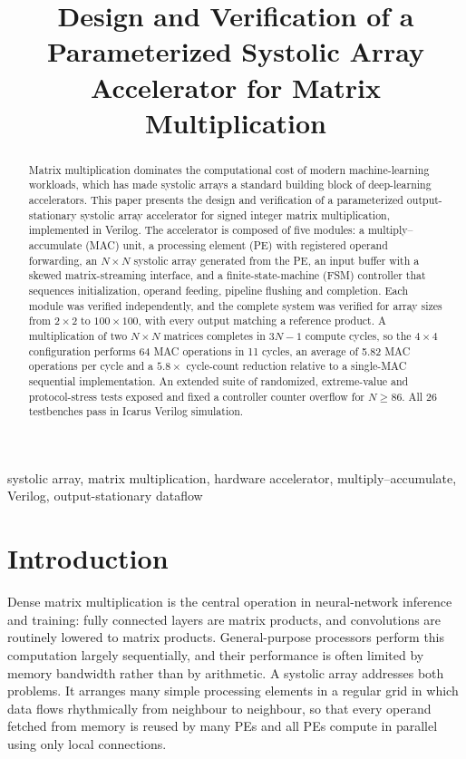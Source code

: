 \documentclass[conference]{IEEEtran}
\begin{document}
\title{Design and Verification of a Parameterized Systolic Array Accelerator for Matrix Multiplication}

\author{
}

\maketitle

\begin{abstract}
Matrix multiplication dominates the computational cost of modern machine-learning
workloads, which has made systolic arrays a standard building block of deep-learning
accelerators. This paper presents the design and verification of a parameterized
output-stationary systolic array accelerator for signed integer matrix multiplication,
implemented in Verilog. The accelerator is composed of five modules: a multiply--accumulate
(MAC) unit, a processing element (PE) with registered operand forwarding, an
$N\times N$ systolic array generated from the PE, an input buffer with a skewed
matrix-streaming interface, and a finite-state-machine (FSM) controller that sequences
initialization, operand feeding, pipeline flushing and completion. Each module was verified
independently, and the complete system was verified for array sizes from $2\times2$ to
$100\times100$, with every output matching a reference product. A multiplication of two
$N\times N$ matrices completes in $3N-1$ compute cycles, so the $4\times4$ configuration
performs 64 MAC operations in 11 cycles, an average of 5.82 MAC operations per cycle and a
$5.8\times$ cycle-count reduction relative to a single-MAC sequential implementation. An
extended suite of randomized, extreme-value and protocol-stress tests exposed and fixed a
controller counter overflow for $N\geq86$. All 26 testbenches pass in Icarus Verilog
simulation.
\end{abstract}

\begin{IEEEkeywords}
systolic array, matrix multiplication, hardware accelerator, multiply--accumulate, Verilog, output-stationary dataflow
\end{IEEEkeywords}

\section{Introduction}
Dense matrix multiplication is the central operation in neural-network inference and
training: fully connected layers are matrix products, and convolutions are routinely lowered
to matrix products. General-purpose processors perform this computation largely
sequentially, and their performance is often limited by memory bandwidth rather than by
arithmetic. A systolic array addresses both problems. It arranges many simple processing
elements in a regular grid in which data flows rhythmically from neighbour to neighbour, so
that every operand fetched from memory is reused by many PEs and all PEs compute in parallel
using only local connections.
\end{document}
